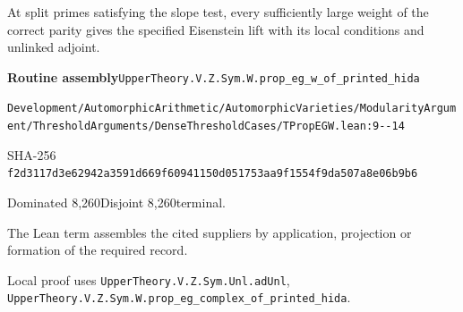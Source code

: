 
\begin{formalstatement}[D077]\label{decomp:D077}
At split primes satisfying the slope test, every sufficiently large weight of the correct parity gives the specified Eisenstein lift with its local conditions and unlinked adjoint.
\end{formalstatement}
{\small\raggedright\noindent\textsf{\bfseries Routine assembly}\quad \nolinkurl{UpperTheory.V.Z.Sym.W.prop_eg_w_of_printed_hida}\par\noindent \nolinkurl{Development/AutomorphicArithmetic/AutomorphicVarieties/ModularityArgument/ThresholdArguments/DenseThresholdCases/TPropEGW.lean:9--14}\par\noindent SHA-256 \nolinkurl{f2d3117d3e62942a3591d669f60941150d051753aa9f1554f9da507a8e06b9b6}\par\noindent Dominated 8,260\quad Disjoint 8,260\quad terminal.\par}
The Lean term assembles the cited suppliers by application, projection or formation of the required record.
{\small\raggedright Local proof uses \nolinkurl{UpperTheory.V.Z.Sym.Unl.adUnl}, \nolinkurl{UpperTheory.V.Z.Sym.W.prop_eg_complex_of_printed_hida}.\par}
